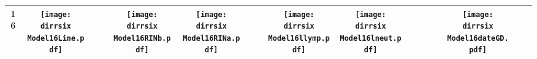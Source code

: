 \documentclass[landscape]{article}
\def \dirrsix{/run/user/1000/gvfs/smb-share:server=cyfiles.iastate.edu,share=09/22/ntyet/R/RA/Data/Reanalysis Data/resultcbc/Model16.Line.RINb.RINa.llymp.lneut.dateGD/}
\begin{document}
\begin{table}
\begin{tabular}{ccccccccccccccccc}
     
     {\Huge \textbf{16}} 
      &\texttt{[image: \\dirrsix Model16Line.pdf]}
      &
      &
      &\texttt{[image: \\dirrsix Model16RINb.pdf]}
      &\texttt{[image: \\dirrsix Model16RINa.pdf]}
      &
      &
      &\texttt{[image: \\dirrsix Model16llymp.pdf]}
      &\texttt{[image: \\dirrsix Model16lneut.pdf]}
      &
      &
      &
      &
      &\texttt{[image: \\dirrsix Model16dateGD.pdf]}
     \\
     \hline
     
\end{tabular}
\end{table}
\end{document}
